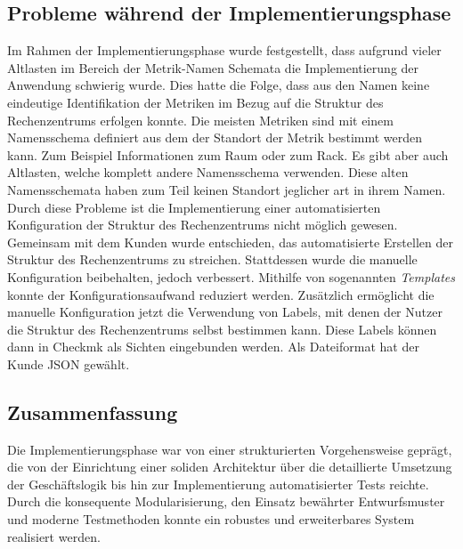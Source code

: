 \subsection{Probleme während der Implementierungsphase}
Im Rahmen der Implementierungsphase wurde festgestellt, dass aufgrund vieler Altlasten im Bereich der Metrik-Namen Schemata die Implementierung der Anwendung schwierig wurde.
Dies hatte die Folge, dass aus den Namen keine eindeutige Identifikation der Metriken im Bezug auf die Struktur des Rechenzentrums erfolgen konnte.
Die meisten Metriken sind mit einem Namensschema definiert aus dem der Standort der Metrik bestimmt werden kann.
Zum Beispiel Informationen zum Raum oder zum Rack.
Es gibt aber auch Altlasten, welche komplett andere Namensschema verwenden.
Diese alten Namensschemata haben zum Teil keinen Standort jeglicher art in ihrem Namen.
Durch diese Probleme ist die Implementierung einer automatisierten Konfiguration der Struktur des Rechenzentrums nicht möglich gewesen.
Gemeinsam mit dem Kunden wurde entschieden, das automatisierte Erstellen der Struktur des Rechenzentrums zu streichen.
Stattdessen wurde die manuelle Konfiguration beibehalten, jedoch verbessert.
Mithilfe von sogenannten \textit{Templates} konnte der Konfigurationsaufwand reduziert werden.
Zusätzlich ermöglicht die manuelle Konfiguration jetzt die Verwendung von Labels, mit denen der Nutzer die Struktur des Rechenzentrums selbst bestimmen kann.
Diese Labels können dann in \Gls{Checkmk} als Sichten eingebunden werden.
Als Dateiformat hat der Kunde \acrshort{JSON} gewählt.

\subsection{Zusammenfassung}
Die Implementierungsphase war von einer strukturierten Vorgehensweise geprägt, die von der Einrichtung einer soliden Architektur über die detaillierte Umsetzung der Geschäftslogik bis hin zur Implementierung automatisierter Tests reichte.
Durch die konsequente Modularisierung, den Einsatz bewährter Entwurfsmuster und moderne Testmethoden konnte ein robustes und erweiterbares System realisiert werden.

